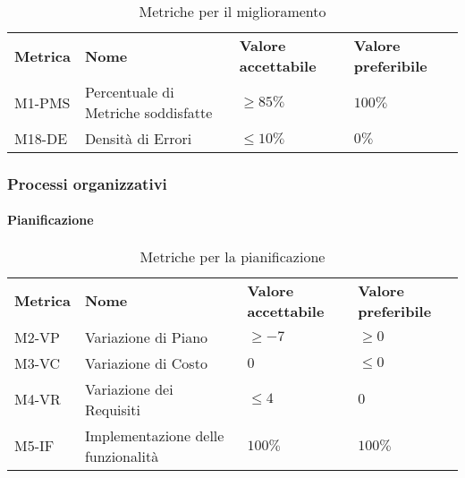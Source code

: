 \begin{table}[h]
    \begin{adjustbox}{width=\textwidth}
    \centering
    \renewcommand{\arraystretch}{1.5}
    \begin{tabular}{>{\centering\arraybackslash} m{2cm} >{\centering\arraybackslash} m{6cm} >{\centering\arraybackslash} m{3cm} >{\centering\arraybackslash} m{3cm}}
    \rowcolor[HTML]{bfbfbf} 
    \textbf{Metrica} & \textbf{Nome} & \textbf{Valore accettabile} & \textbf{Valore preferibile} \\
    M1-PMS & Percentuale di  Metriche soddisfatte & $\ge 85\%$ & $100\%$\\
    M18-DE & Densità di Errori & $\le 10\%$ & $0\%$\\
    \end{tabular}
    \end{adjustbox}
    \caption{Metriche per il miglioramento}
\end{table}


\subsubsection{Processi organizzativi} \label{processi organizzativi}
\paragraph{Pianificazione}

\begin{table}[h]
    \begin{adjustbox}{width=\textwidth}
    \centering
    \renewcommand{\arraystretch}{1.5}
    \begin{tabular}{>{\centering\arraybackslash} m{2cm} >{\centering\arraybackslash} m{6cm} >{\centering\arraybackslash} m{3cm} >{\centering\arraybackslash} m{3cm}}
    \rowcolor[HTML]{bfbfbf} 
    \textbf{Metrica} & \textbf{Nome} & \textbf{Valore accettabile} & \textbf{Valore preferibile} \\
    M2-VP & Variazione di Piano & $\ge -7$ & $\ge 0$\\
    M3-VC & Variazione di Costo & $0$ & $\le 0$\\
    M4-VR & Variazione dei Requisiti & $\le 4$ & $0$\\
    M5-IF & Implementazione delle funzionalità & $100\%$ & $100\%$\\
    \end{tabular}
    \end{adjustbox}
    \caption{Metriche per la pianificazione}
\end{table}